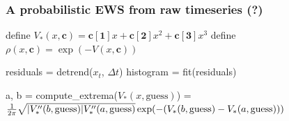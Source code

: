 \documentclass[./main.tex]{subfiles}
\begin{document}
\begin{frame}[t, label=slide16]
        \frametitle{A probabilistic EWS from raw timeseries (?)}

        \footnotesize

        \begin{algorithm}[H]

                \BlankLine

                define $V_{*}(x,\boldsymbol{c}) = \boldsymbol{c[1]}x + \boldsymbol{c[2]}x^{2} + \boldsymbol{c[3]}x^{3}$\;
                define $\rho(x,\boldsymbol{c})=\exp(-V(x,\boldsymbol{c}))$\;

                \BlankLine
                \BlankLine

                residuals = detrend($x_{t}$, $\Delta t$)\;
                histogram = fit(residuals)\;

                \BlankLine


                \BlankLine

                a, b = compute\_extrema($V_{*}(x, \text{guess})$)\;
                = $\frac{1}{2\pi}\sqrt{|V_{*}''(b, \text{guess})|V_{*}''(a, \text{guess})}\exp(-(V_{*}(b, \text{guess})-V_{*}(a, \text{guess})))$\;

                \BlankLine
                \BlankLine

        \end{algorithm}

\end{frame}
\end{document}
